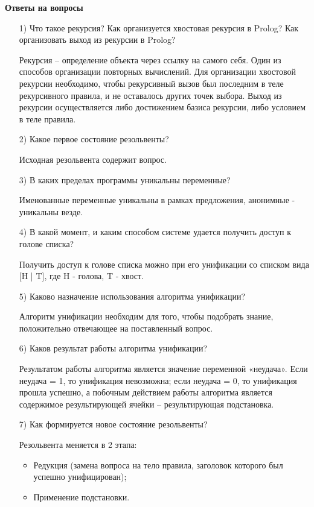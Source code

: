 \documentclass[12pt, a4paper]{extarticle}
\begin{document}
\newpage

\textbf{Ответы на вопросы}
\begin{itemize}
	\item[1)] Что такое рекурсия? Как организуется хвостовая рекурсия в Prolog? Как организовать выход из рекурсии в Prolog?\par	
	Рекурсия – определение объекта через ссылку на самого себя. Один из
	способов организации повторных вычислений. Для организации хвостовой рекурсии необходимо, чтобы рекурсивный вызов был последним в теле рекурсивного правила, и не оставалось других точек выбора. Выход из рекурсии осуществляется либо достижением базиса рекурсии, либо условием в теле правила.
	
	\item[2)] Какое первое состояние резольвенты?\par
	Исходная резольвента содержит вопрос.
	
	\item[3)] В каких пределах программы уникальны переменные?\par
	Именованные переменные уникальны в рамках предложения, анонимные - уникальны везде.
	
	\item[4)] В какой момент, и каким способом системе удается получить доступ к голове списка?\par	
	Получить доступ к голове списка можно при его унификации со списком
	вида [H | T], где H - голова, T - хвост.
	
	\item[5)] Каково назначение использования алгоритма унификации?\par
	Алгоритм унификации необходим для того, чтобы подобрать знание, положительно отвечающее на поставленный вопрос.
	
	\item[6)] Каков результат работы алгоритма унификации?\par
	Результатом работы алгоритма является значение переменной «неудача».
	Если неудача = 1, то унификация невозможна; если неудача = 0, то унификация
	прошла успешно, а побочным действием работы алгоритма является содержимое
	результирующей ячейки – результирующая подстановка.
	
	\item[7)] Как формируется новое состояние резольвенты?\par
	Резольвента меняется в 2 этапа:
	\begin{itemize}
		\item Редукция (замена вопроса на тело правила, заголовок которого был успешно унифицирован);
		\item Применение подстановки.
	\end{itemize}


\end{itemize}
\end{document}
